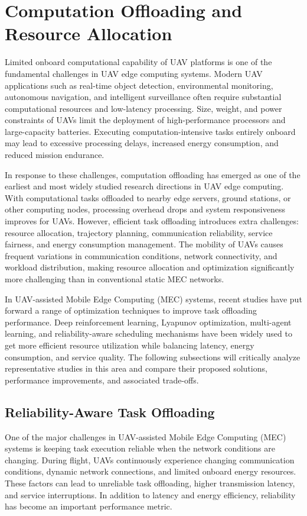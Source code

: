 \documentclass[a4paper, 12pt]{article}
\begin{document}
\section*{Computation Offloading and Resource Allocation}
Limited onboard computational capability of UAV platforms is one of the fundamental challenges in UAV edge computing systems. Modern UAV applications such as real-time object detection, environmental monitoring, autonomous navigation, and intelligent surveillance often require substantial computational resources and low-latency processing. Size, weight, and power constraints of UAVs limit the deployment of high-performance processors and large-capacity batteries. Executing computation-intensive tasks entirely onboard may lead to excessive processing delays, increased energy consumption, and reduced mission endurance.

In response to these challenges, computation offloading has emerged as one of the earliest and most widely studied research directions in UAV edge computing. With computational tasks offloaded to nearby edge servers, ground stations, or other computing nodes, processing overhead drops and system responsiveness improves for UAVs. However, efficient task offloading introduces extra challenges: resource allocation, trajectory planning, communication reliability, service fairness, and energy consumption management. The mobility of UAVs causes frequent variations in communication conditions, network connectivity, and workload distribution, making resource allocation and optimization significantly more challenging than in conventional static MEC networks.

In UAV-assisted Mobile Edge Computing (MEC) systems, recent studies have put forward a range of optimization techniques to improve task offloading performance. Deep reinforcement learning, Lyapunov optimization, multi-agent learning, and reliability-aware scheduling mechanisms have been widely used to get more efficient resource utilization while balancing latency, energy consumption, and service quality. The following subsections will critically analyze representative studies in this area and compare their proposed solutions, performance improvements, and associated trade-offs.

\subsection*{Reliability-Aware Task Offloading}
One of the major challenges in UAV-assisted Mobile Edge Computing (MEC) systems is keeping task execution reliable when the network conditions are changing. During flight, UAVs continuously experience changing communication conditions, dynamic network connections, and limited onboard energy resources. These factors can lead to unreliable task offloading, higher transmission latency, and service interruptions. In addition to latency and energy efficiency, reliability has become an important performance metric.
\end{document}
